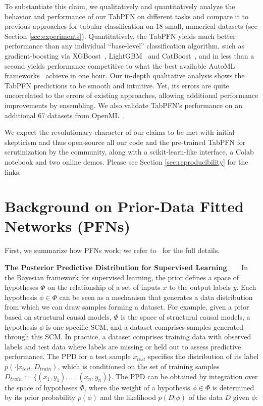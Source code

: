 To substantiate this claim, we qualitatively and quantitatively analyze the behavior and performance of our TabPFN on different tasks and compare it to previous approaches for tabular classification on $18$ small, numerical datasets (see Section \ref{sec:experiments}). 
Quantitatively, the TabPFN yields much better performance than any individual ``base-level'' classification algorithm, such as gradient-boosting via XGBoost~\citep{chen-kdd16a}, LightGBM~\citep{ke-neurips17a} and CatBoost~\citep{prokhorenkova-neurips18a}, and in less than a second yields performance competitive to what the best available AutoML frameworks~\citep{erickson-arxiv20a,feurer-arxiv20v2} achieve in one hour. Our in-depth qualitative analysis shows the TabPFN predictions to be smooth and intuitive. Yet, its errors are quite uncorrelated to the errors of existing approaches, allowing additional performance improvements by ensembling. We also validate TabPFN's performance on an additional 67 datasets from OpenML~\cite{vanschoren-sigkdd14a}.

We expect the revolutionary character of our claims to be met with initial skepticism and thus open-source all our code and the pre-trained TabPFN for scrutinization by the community, along with a scikit-learn-like interface, a Colab notebook and two online demos. Please see Section \ref{sec:reproducibility} for the links.

\section{Background on Prior-Data Fitted Networks (PFNs)}
\label{sec:prior_fitted_intro}

First, we summarize how PFNs work; we refer to~\cite{muller-iclr22a} for the full details.

\textbf{The Posterior Predictive Distribution for Supervised Learning~~~} In the Bayesian framework for supervised learning, the prior defines a space of hypotheses $\Phi$ on the relationship of a set of inputs $x$ to the output labels $y$. Each hypothesis $\phi\in\Phi$ can be seen as a mechanism that generates a data distribution from which we can draw samples forming a dataset. For example, given a prior based on structural causal models, $\Phi$ is the space of structural causal models, a hypothesis $\phi$ is one specific SCM, and a dataset comprises samples generated through this SCM. In practice, a dataset comprises training data with observed labels and test data where labels are missing or held out to assess predictive performance. The PPD for a test sample $x_{test}$ specifies the distribution of its label $p(\cdot|x_{test},D_{train})$, which is conditioned on the set of training samples $D_{train} := \{(x_1,y_1), \dots, (x_n,y_n)\}$.
The PPD can be obtained by integration over the space of hypotheses $\Phi$, where the weight of a hypothesis $\phi\in\Phi$ is determined by its prior probability $p(\phi)$ and the likelihood $p(D|\phi)$ of the data $D$ given $\phi$:

